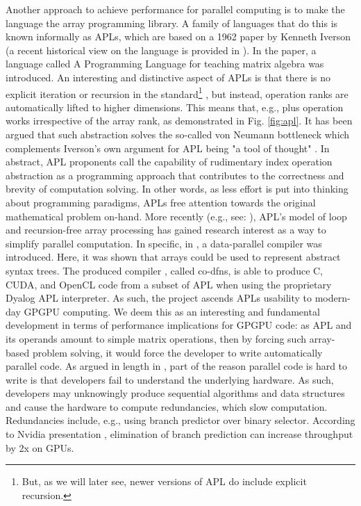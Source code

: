\documentclass{IEEEtran}
\begin{document}
Another approach to achieve performance for parallel computing is to make the language the array programming library. A family of languages that do this is known informally as APLs, which are based on a 1962 paper \cite{iverson1962programming} by Kenneth Iverson (a recent historical view on the language is provided in \cite{hui2020apl}). In the paper, a language called A Programming Language for teaching matrix algebra was introduced. An interesting and distinctive aspect of APLs is that there is no explicit iteration or recursion in the standard\footnote{But, as we will later see, newer versions of APL do include explicit recursion.} \cite{isoapl}, but instead, operation ranks are automatically lifted to higher dimensions. This means that, e.g., plus operation works irrespective of the array rank, as demonstrated in Fig. \ref{fig:apl}. It has been argued \cite{slepak2014array} that such abstraction solves the so-called von Neumann bottleneck \cite{backus1978can} which complements Iverson's own argument for APL being "a tool of thought" \cite{iverson2007notation}. In abstract, APL proponents call the capability of rudimentary index operation abstraction as a programming approach that contributes to the correctness and brevity of computation solving. In other words, as less effort is put into thinking about programming paradigms, APLs free attention towards the original mathematical problem on-hand. More recently (e.g., see: \cite{hsu2019phd, slepak2014array}), APL's model of loop and recursion-free array processing has gained research interest as a way to simplify parallel computation. In specific, in \cite{hsu2019phd}, a data-parallel compiler was introduced. Here, it was shown that arrays could be used to represent abstract syntax trees. The produced compiler \cite{codfns}, called co-dfns, is able to produce C, \gls{CUDA}, and OpenCL code from a subset of APL when using the proprietary Dyalog APL interpreter. As such, the project ascends APLs usability to modern-day \gls{GPGPU} computing. We deem this as an interesting and fundamental development in terms of performance implications for \gls{GPGPU} code: as APL and its operands amount to simple matrix operations, then by forcing such array-based problem solving, it would force the developer to write automatically parallel code. As argued in length in \cite{mckenney2017parallel}, part of the reason parallel code is hard to write is that developers fail to understand the underlying hardware. As such, developers may unknowingly produce sequential algorithms and data structures and cause the hardware to compute redundancies, which slow computation. Redundancies include, e.g., using branch predictor over binary selector. According to Nvidia presentation \cite{harris2007optimizing}, elimination of branch prediction can increase throughput by 2x on GPUs.
\end{document}

